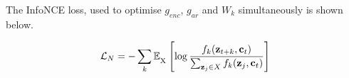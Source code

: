 

	
	The InfoNCE loss, used to optimise $g_{enc}$, $g_{ar}$ and $W_k$ simultaneously is shown below. 

	\begin{equation} %
		\mathcal{L}_N = - \sum_{k} \expected{\textsubscript{X}} \left[ \log \nceprediction \right] \label{eq:NCE_loss}
	\end{equation}
	
